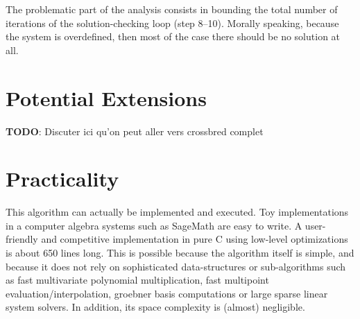 \documentclass[a4paper,UKenglish,cleveref, autoref]{lipics-v2019}
\newcommand{\red}{\color{red}}
\newcommand{\TODO}[1]{{\red \textbf{TODO}:} #1\xspace}
\begin{document}
The problematic part of the analysis consists in bounding the total number of
iterations of the solution-checking loop (step 8--10). Morally speaking, because
the system is overdefined, then most of the case there should be no solution at all.

\section{Potential Extensions}
\label{sec:extensions}

\TODO{Discuter ici qu'on peut aller vers crossbred complet}

\section{Practicality}

This algorithm can actually be implemented and executed. Toy implementations in
a computer algebra systems such as \textsf{SageMath} are easy to write. A
user-friendly and competitive implementation in pure C using low-level
optimizations is about 650 lines long. This is possible because the algorithm
itself is simple, and because it does not rely on sophisticated data-structures
or sub-algorithms such as fast multivariate polynomial multiplication, fast
multipoint evaluation/interpolation, groebner basis computations or large sparse
linear system solvers. In addition, its space complexity is (almost) negligible.


\end{document}
